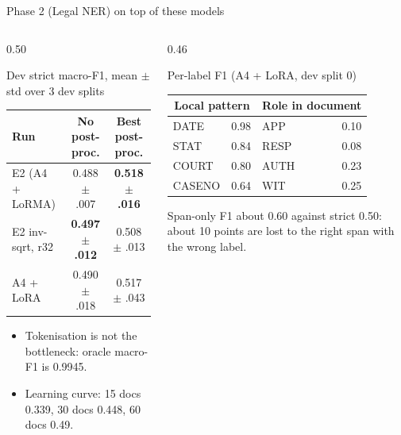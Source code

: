 \documentclass[aspectratio=169,11pt]{beamer}
\begin{document}
\begin{frame}{Phase 2 (Legal NER) on top of these models}
  \begin{columns}[T]
    \begin{column}{0.50\textwidth}
      \footnotesize
      \begin{block}{Dev strict macro-F1, mean $\pm$ std over 3 dev splits}
        \begin{tabular}{lcc}
          \toprule
          Run & No post-proc. & Best post-proc. \\
          \midrule
          E2 (A4 + LoRMA)  & 0.488 $\pm$ .007 & \textbf{0.518 $\pm$ .016} \\
          E2 inv-sqrt, r32 & \textbf{0.497 $\pm$ .012} & 0.508 $\pm$ .013 \\
          A4 + LoRA        & 0.490 $\pm$ .018 & 0.517 $\pm$ .043 \\
          \bottomrule
        \end{tabular}
      \end{block}
      \begin{itemize}
        \item Tokenisation is not the bottleneck: oracle macro-F1 is 0.9945.
        \item Learning curve: 15 docs 0.339, 30 docs 0.448, 60 docs 0.49.
      \end{itemize}
    \end{column}
    \begin{column}{0.46\textwidth}
      \footnotesize
      \begin{block}{Per-label F1 (A4 + LoRA, dev split 0)}
        \begin{tabular}{lr@{\hspace{6mm}}lr}
          \toprule
          \multicolumn{2}{c}{Local pattern} & \multicolumn{2}{c}{Role in document} \\
          \midrule
          DATE   & 0.98 & APP  & \textcolor{warm}{0.10} \\
          STAT   & 0.84 & RESP & \textcolor{warm}{0.08} \\
          COURT  & 0.80 & AUTH & \textcolor{warm}{0.23} \\
          CASENO & 0.64 & WIT  & \textcolor{warm}{0.25} \\
          \bottomrule
        \end{tabular}
      \end{block}
      Span-only F1 about 0.60 against strict 0.50: about 10 points are lost to the right span with the wrong label.
    \end{column}
  \end{columns}
\end{frame}
\end{document}
